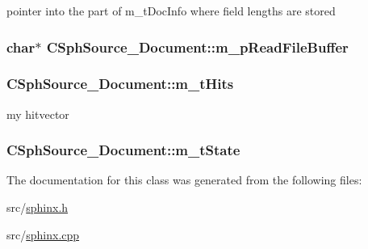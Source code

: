 pointer into the part of m\-\_\-t\-Doc\-Info where field lengths are stored 

\hypertarget{classCSphSource__Document_a3a9170d3ee94eb5718382d06eabbdb2b}{
\subsubsection[{m\-\_\-p\-Read\-File\-Buffer}]{\setlength{\rightskip}{0pt plus 5cm}char$\ast$ C\-Sph\-Source\-\_\-\-Document\-::m\-\_\-p\-Read\-File\-Buffer\hspace{0.3cm}{\ttfamily [protected]}}}\label{classCSphSource__Document_a3a9170d3ee94eb5718382d06eabbdb2b}
\hypertarget{classCSphSource__Document_ab449c37abdd009d23e789d777f8f51a0}{
\subsubsection[{m\-\_\-t\-Hits}]{ C\-Sph\-Source\-\_\-\-Document\-::m\-\_\-t\-Hits\hspace{0.3cm}{\ttfamily [protected]}}}\label{classCSphSource__Document_ab449c37abdd009d23e789d777f8f51a0}


my hitvector 

\hypertarget{classCSphSource__Document_a78b2bdc7a1546cab235ac95f0840b2d4}{
\subsubsection[{m\-\_\-t\-State}]{ C\-Sph\-Source\-\_\-\-Document\-::m\-\_\-t\-State\hspace{0.3cm}{\ttfamily [protected]}}}\label{classCSphSource__Document_a78b2bdc7a1546cab235ac95f0840b2d4}


The documentation for this class was generated from the following files\-:\begin{DoxyCompactItemize}
\item 
src/\hyperlink{sphinx_8h}{sphinx.\-h}\item 
src/\hyperlink{sphinx_8cpp}{sphinx.\-cpp}\end{DoxyCompactItemize}
